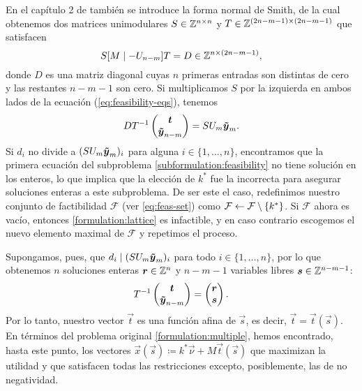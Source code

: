 En el capítulo 2 de \cite{morris} también se introduce la forma normal de Smith, de la cual
obtenemos dos matrices unimodulares $S \in \mathbb{Z}^{n \times n}$ y $T \in \mathbb{Z}^{(2n - m - 1) \times (2n - m
-1)}$ que satisfacen
\begin{equation*}
	S[M \mid -U_{n-m}]T = D \in \mathbb{Z}^{n \times (2n - m - 1)},
\end{equation*}
donde $D$ es una matriz diagonal cuyas $n$ primeras entradas son distintas de cero y las restantes
$n - m - 1$ son cero. Si multiplicamos $S$ por la izquierda en ambos lados de la ecuación
(\ref{eq:feasibility-eqs}), tenemos
\begin{equation}
	\label{eq:sum}
	DT^{-1}\begin{pmatrix} \boldsymbol{t} \\ \boldsymbol{\tilde{y}}_{n-m} \end{pmatrix}
	= SU_m\boldsymbol{\tilde{y}}_{m}.
\end{equation}
Si $d_i$ no divide a $(SU_m\boldsymbol{\tilde{y}}_{m})_i$ para alguna $i \in \lbrace 1, \ldots, n \rbrace$,
encontramos que la primera ecuación del subproblema \eqref{subformulation:feasibility} no tiene
solución en los enteros, lo que implica que la elección de $k^*$ fue la incorrecta para asegurar
soluciones enteras a este subproblema. De ser este el caso, redefinimos nuestro conjunto de
factibilidad $\mathcal{F}$ (ver \eqref{eq:feas-set}) como $\mathcal{F} \leftarrow \mathcal{F}
\setminus \lbrace k^* \rbrace$. Si $\mathcal{F}$ ahora es vacío, entonces \eqref{formulation:lattice} es
infactible, y en caso contrario escogemos el nuevo elemento maximal de $\mathcal{F}$ y repetimos el proceso.

Supongamos, pues, que $d_i \mid (SU_m\boldsymbol{\tilde{y}}_{m})_i$ para todo $i \in \lbrace 1, \ldots,
n\rbrace$, por lo que obtenemos $n$ soluciones enteras $\boldsymbol{r} \in \mathbb{Z}^n$ y $n - m - 1$ variables
libres $\boldsymbol{s} \in \mathbb{Z}^{n-m-1}$:
\begin{equation*}
	T^{-1}\begin{pmatrix} \boldsymbol{t} \\ \boldsymbol{\tilde{y}}_{n-m} \end{pmatrix}
	=
	\begin{pmatrix} \boldsymbol{r} \\ \boldsymbol{s} \end{pmatrix}.
\end{equation*}
Por lo tanto, nuestro vector $\vec{t}$ es una función afina de $\vec{s}$, es decir, $\vec{t} =
\vec{t}(\vec{s})$. En términos del problema original \eqref{formulation:multiple}, hemos encontrado,
hasta este punto, los vectores $\vec{x}(\vec{s}) \coloneq k^*\vec{\nu} + M\vec{t}(\vec{s})$ que
maximizan la utilidad y que satisfacen todas las restricciones excepto, posiblemente, las de no
negatividad.


